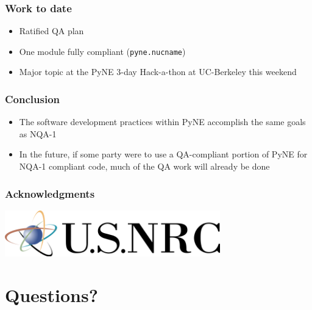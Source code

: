 \documentclass[12pt]{beamer}
\begin{document}
\begin{frame}
\frametitle{Work to date}

\begin{itemize}
\item{Ratified QA plan}
\item{One module fully compliant (\texttt{pyne.nucname})}
\item{Major topic at the PyNE 3-day Hack-a-thon at UC-Berkeley this weekend}
\end{itemize}

\end{frame}
\begin{frame}
\frametitle{Conclusion}

\begin{itemize}
\item{The software development practices within PyNE accomplish the same goals as NQA-1}
\item{In the future, if some party were to use a QA-compliant portion of PyNE for NQA-1 compliant code, much of the QA work will already be done}
\end{itemize}

\end{frame}
\begin{frame}[fragile]
\frametitle{Acknowledgments}

\includegraphics[height=2cm]{figures/NRClogo.png} \\

\end{frame}


\section*{Questions?}
\end{document}
